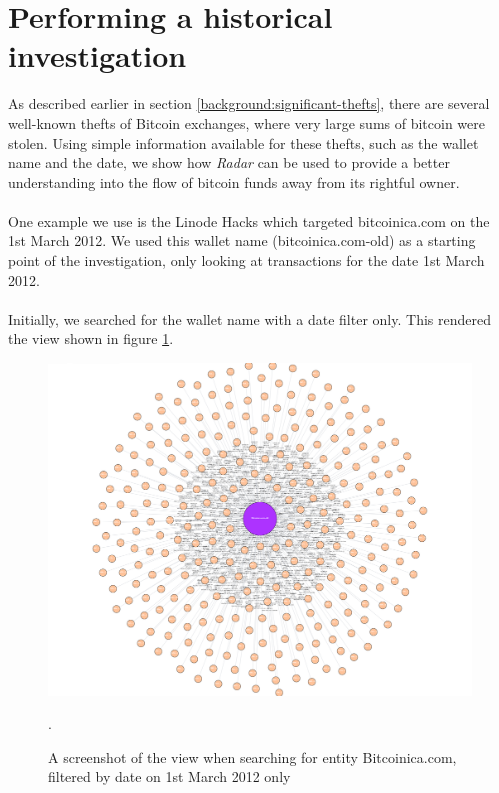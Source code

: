\section{Performing a historical investigation}
As described earlier in section \ref{background:significant-thefts}, there are several well-known thefts of Bitcoin exchanges, where very large sums of bitcoin were stolen. Using simple information available for these thefts, such as the wallet name and the date, we show how \textit{Radar} can be used to provide a better understanding into the flow of bitcoin funds away from its rightful owner.
\\\\
One example we use is the Linode Hacks which targeted bitcoinica.com on the 1st March 2012. We used this wallet name (bitcoinica.com-old) as a starting point of the investigation, only looking at transactions for the date 1st March 2012. 
\\\\
Initially, we searched for the wallet name with a date filter only. This rendered the view shown in figure \ref{fig:theft-no-filter}.

\begin{figure}[h!]
  \centering
  \includegraphics[width = 15cm]{./figures/theft-all-txs-1st-march}\\[0.5cm]
  \caption{A screenshot of the view when searching for entity Bitcoinica.com, filtered by date on 1st March 2012 only}.
  \label{fig:theft-no-filter}
\end{figure}


